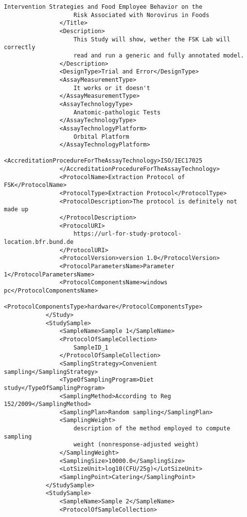 \begin{lstlisting}[language=RAKIP, caption={Example of GenericModel}]
                    Intervention Strategies and Food Employee Behavior on the
                    Risk Associated with Norovirus in Foods
                </Title>
                <Description>
                    This Study will show, wether the FSK Lab will correctly
                    read and run a generic and fully annotated model.
                </Description>
                <DesignType>Trial and Error</DesignType>
                <AssayMeasurementType>
                    It works or it doesn't
                </AssayMeasurementType>
                <AssayTechnologyType>
                    Anatomic-pathologic Tests
                </AssayTechnologyType>
                <AssayTechnologyPlatform>
                    Orbital Platform
                </AssayTechnologyPlatform>
                <AccreditationProcedureForTheAssayTechnology>ISO/IEC17025
                </AccreditationProcedureForTheAssayTechnology>
                <ProtocolName>Extraction Protocol of FSK</ProtocolName>
                <ProtocolType>Extraction Protocol</ProtocolType>
                <ProtocolDescription>The protocol is definitely not made up
                </ProtocolDescription>
                <ProtocolURI>
                    https://url-for-study-protocol-location.bfr.bund.de
                </ProtocolURI>
                <ProtocolVersion>version 1.0</ProtocolVersion>
                <ProtocolParametersName>Parameter 1</ProtocolParametersName>
                <ProtocolComponentsName>windows pc</ProtocolComponentsName>
                <ProtocolComponentsType>hardware</ProtocolComponentsType>
            </Study>
            <StudySample>
                <SampleName>Sample 1</SampleName>
                <ProtocolOfSampleCollection>
                    SampleID_1
                </ProtocolOfSampleCollection>
                <SamplingStrategy>Convenient sampling</SamplingStrategy>
                <TypeOfSamplingProgram>Diet study</TypeOfSamplingProgram>
                <SamplingMethod>According to Reg 152/2009</SamplingMethod>
                <SamplingPlan>Random sampling</SamplingPlan>
                <SamplingWeight>
                    description of the method employed to compute sampling
                    weight (nonresponse-adjusted weight)
                </SamplingWeight>
                <SamplingSize>10000.0</SamplingSize>
                <LotSizeUnit>log10(CFU/25g)</LotSizeUnit>
                <SamplingPoint>Catering</SamplingPoint>
            </StudySample>
            <StudySample>
                <SampleName>Sample 2</SampleName>
                <ProtocolOfSampleCollection>

\end{lstlisting}
